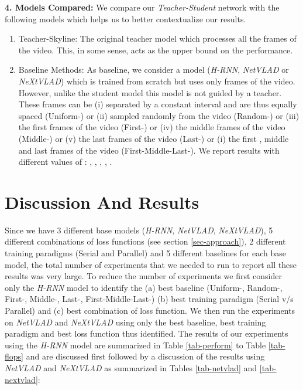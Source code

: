 \documentclass[10pt,twocolumn,letterpaper]{article}
\newcommand{\full}{Teacher-Skyline}
\newcommand{\kstart}[1]{First-}
\newcommand{\kmid}[1]{Middle-}
\newcommand{\kend}[1]{Last-}
\newcommand{\sme}[1]{First-Middle-Last-}
\newcommand{\uni}[1]{Uniform-}
\newcommand{\rand}[1]{Random-}
\begin{document}
\noindent \textbf{4. Models Compared:} We compare our \textit{Teacher-Student} network with the following models which helps us to better contextualize our results. \begin{enumerate}[leftmargin=*,label=\alph*)]
\item \full: The original teacher model which processes all the frames of the video. This, in some sense, acts as the upper bound on the performance.
\item Baseline Methods: As baseline, we consider a model (\textit{H-RNN}, \textit{NetVLAD} or \textit{NeXtVLAD}) which is trained from scratch but uses only  frames of the video. However, unlike the student model this model is not guided by a teacher. These  frames can be (i) separated by a constant interval and are thus equally spaced (\uni{k}) or (ii) sampled randomly from the video (\rand{k}) or (iii) the first  frames of the video (\kstart{k}) or (iv) the middle  frames of the video (\kmid{k}) or (v) the last  frames of the video (\kend{k}) or (i) the first , middle  and last  frames of the video (\sme{k}). We report results with different values of  : , , , , .
\end{enumerate}


\section{Discussion And Results} 
Since we have 3 different base models (\textit{H-RNN}, \textit{NetVLAD}, \textit{NeXtVLAD}), 5 different combinations of loss functions (see section \ref{sec-approach}), 2 different training paradigms (Serial and Parallel) and 5 different baselines for each base model, the total number of experiments that we needed to run to report all these results was very large. To reduce the number of experiments we first consider only the \textit{H-RNN} model to identify the (a) best baseline (\uni{k}, \rand{k}, \kstart{k}, \kmid{k}, \kend{k}, \sme{k})  (b) best training paradigm (Serial v/s Parallel) and (c) best combination of loss function. We then run the experiments on \textit{NetVLAD} and \textit{NeXtVLAD} using only the best baseline, best training paradigm and best loss function thus identified. The results of our experiments using the \textit{H-RNN} model are summarized in Table \ref{tab-perform} to Table \ref{tab-flops} and are discussed first followed by a discussion of the results using \textit{NetVLAD} and \textit{NeXtVLAD} as summarized in Tables \ref{tab-netvlad} and \ref{tab-nextvlad}:    
\end{document}
